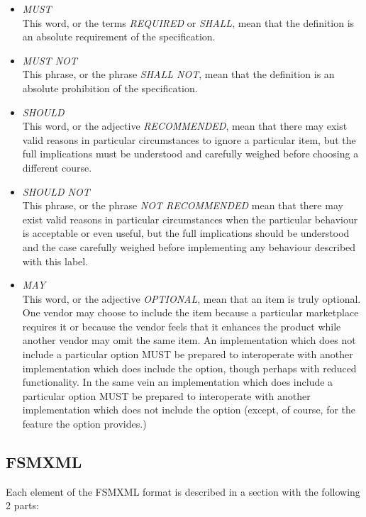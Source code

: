 \documentclass[a4paper]{article}
\begin{document}
\begin{itemize}
\item \emph{MUST}\\This word, or the terms \emph{REQUIRED} or
  \emph{SHALL}, mean that the definition is an absolute requirement of
  the specification.

\item \emph{MUST NOT}\\This phrase, or the phrase \emph{SHALL NOT},
  mean that the definition is an absolute prohibition of the
  specification.

\item \emph{SHOULD}\\This word, or the adjective \emph{RECOMMENDED},
  mean that there may exist valid reasons in particular circumstances
  to ignore a particular item, but the full implications must be
  understood and carefully weighed before choosing a different course.

\item \emph{SHOULD NOT}\\This phrase, or the phrase \emph{NOT
    RECOMMENDED} mean that there may exist valid reasons in particular
  circumstances when the particular behaviour is acceptable or even
  useful, but the full implications should be understood and the case
  carefully weighed before implementing any behaviour described with
  this label.

\item \emph{MAY}\\This word, or the adjective \emph{OPTIONAL}, mean
  that an item is truly optional.  One vendor may choose to include
  the item because a particular marketplace requires it or because the
  vendor feels that it enhances the product while another vendor may
  omit the same item.  An implementation which does not include a
  particular option MUST be prepared to interoperate with another
  implementation which does include the option, though perhaps with
  reduced functionality. In the same vein an implementation which does
  include a particular option MUST be prepared to interoperate with
  another implementation which does not include the option (except, of
  course, for the feature the option provides.)
\end{itemize}

\subsection{FSMXML}

Each element of the FSMXML format is described in a section with the
following 2 parts:
\end{document}

